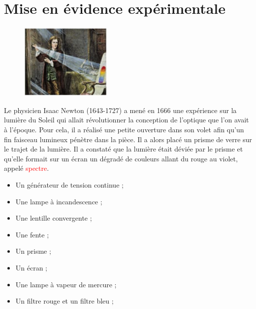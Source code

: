 \section{Mise en évidence expérimentale}
\begin{tcolorbox}[colback=orange!5!white,colframe=orange!75!black,title= Expérience d'Isaac Newton :]
\begin{figure}
    \centering
     \includegraphics[width=0.4\textwidth]{Images/TP/TP10/Isaac_Newton.PNG}
   \end{figure}
Le physicien Isaac Newton (1643-1727) a mené en 1666 une expérience sur la lumière du Soleil qui allait révolutionner la conception de l'optique que l'on avait à l'époque. Pour cela, il a réalisé une petite ouverture dans son volet afin qu'un fin faisceau lumineux pénètre dans la pièce. Il a alors placé un prisme de verre sur le trajet de la lumière. Il a constaté que la lumière était déviée par le prisme et qu'elle formait sur un écran un dégradé de couleurs allant du rouge au violet, appelé \textcolor{red}{spectre}.\\

\end{tcolorbox}

\begin{mdframed}[style=autreexo]
\textbf{}
\begin{multicols}{2}
    \begin{itemize}
    \item Un générateur de tension continue ;
    \item Une lampe à incandescence ;
    \item Une lentille convergente ;
    \item Une fente ;
    \item Un prisme ;
    \item Un écran ;
    \item Une lampe à vapeur de mercure ;
    \item Un filtre rouge et un filtre bleu ;
\end{itemize}
\end{multicols}
\end{mdframed}

